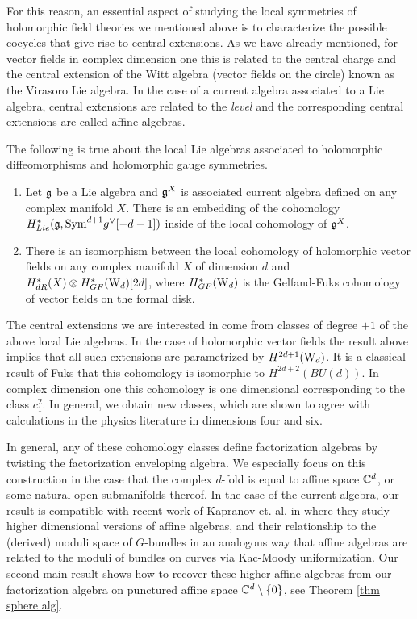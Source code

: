 \documentclass[10pt]{amsart}
\begin{document}
For this reason, an essential aspect of studying the local symmetries of holomorphic field theories we mentioned above is to characterize the possible cocycles that give rise to central extensions. 
As we have already mentioned, for vector fields in complex dimension one this is related to the central charge and the central extension of the Witt algebra (vector fields on the circle) known as the Virasoro Lie algebra.
In the case of a current algebra associated to a Lie algebra, central extensions are related to the {\em level} and the corresponding central extensions are called affine algebras. 

\begin{thm}\label{thm: chap3 1}
The following is true about the local Lie algebras associated to holomorphic diffeomorphisms and holomorphic gauge symmetries.
\begin{enumerate}
\item Let $\mathfrak g$ be a Lie algebra and $\mathfrak g^X$ is associated current algebra defined on any complex manifold $X$. 
There is an embedding of the cohomology $H^*_{Lie}(\mathfrak g , {\rm Sym}^{d+1} g^\vee [-d-1])$ inside of the local cohomology of $\mathfrak g^X$.
\item There is an isomorphism between the local cohomology of holomorphic vector fields on any complex manifold $X$ of dimension $d$ and $H_{dR}^*(X) \otimes H^*_{GF}({\rm W}_d)[2d]$, where  $H^*_{GF}({\rm W}_d)$ is the Gelfand-Fuks cohomology of vector fields on the formal disk.
\end{enumerate}
\end{thm}

The central extensions we are interested in come from classes of degree $+1$ of the above local Lie algebras.
In the case of holomorphic vector fields the result above implies that all such extensions are parametrized by $H^{2d+1}({\rm W}_d)$. 
It is a classical result of Fuks \cite{Fuks} that this cohomology is isomorphic to $H^{2d+2}(BU(d))$. 
In complex dimension one this cohomology is one dimensional corresponding to the class $c_1^2$. 
In general, we obtain new classes, which are shown to agree with calculations in the physics 
literature in dimensions four and six. 

In general, any of these cohomology classes define factorization algebras by twisting the factorization enveloping algebra. 
We especially focus on this construction in the case that the complex $d$-fold is equal to affine space $\mathbb C^d$, or some natural open submanifolds thereof.
In the case of the current algebra, our result is compatible with recent work of Kapranov et. al. in \cite{FHK} where they study higher dimensional versions of affine algebras, and their relationship to the (derived) moduli space of $G$-bundles in an analogous way that affine algebras are related to the moduli of bundles on curves via Kac-Moody uniformization.  
Our second main result shows how to recover these higher affine algebras from our factorization algebra on punctured affine space $\mathbb C^d \setminus\{0\}$, see Theorem \ref{thm sphere alg}.
\end{document}
